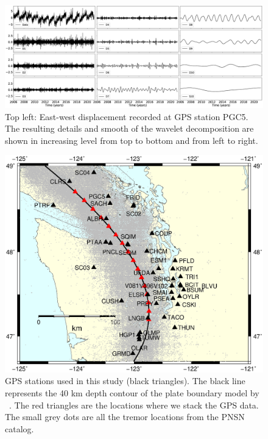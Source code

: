 \documentclass{article}
\begin{document}
\begin{figure}
\noindent\includegraphics[width=\textwidth, trim={0cm 0cm 0cm 0cm},clip]{figures/cleaned_PGC5_lon.eps}
\caption{Top left: East-west displacement recorded at GPS station PGC5. The resulting details and smooth of the wavelet decomposition are shown in increasing level from top to bottom and from left to right.}
\label{pngfiguresample}
\end{figure}

\begin{figure}
\noindent\includegraphics[width=\textwidth, trim={0cm 0cm 0cm 0cm},clip]{figures/map_GPS_stations.eps}
\caption{GPS stations used in this study (black triangles). The black line represents the 40 km depth contour of the plate boundary model by ~\citet{PRE_2003}. The red triangles are the locations where we stack the GPS data. The small grey dots are all the tremor locations from the PNSN catalog.}
\label{pngfiguresample}
\end{figure}
\end{document}
